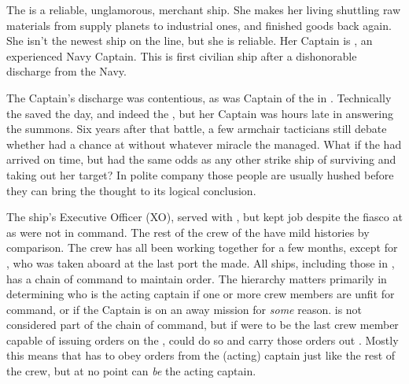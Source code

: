 \documentclass[blue]{TMFHope}
\begin{document}
\name{\bHope{}}

The \pNew{} is a reliable, unglamorous, merchant ship. She makes her living shuttling raw materials from supply planets to industrial ones, and finished goods back again. She isn't the newest ship on the line, but she is reliable. Her Captain is \cCap{}, an experienced Navy Captain. This is \cCap{\their} first civilian ship after a dishonorable discharge from the Navy.  

The Captain's discharge was contentious, as \cCap{} was Captain of the \pOld{} in \pBattle{}. Technically the \pOld{} saved the day, and indeed the \pPlan{}, but her Captain was hours late in answering the summons. Six years after that battle, a few armchair tacticians still debate whether \pPlan{} had a chance at \pHome{} without whatever miracle the \pOld{} managed. What if the \pOld{} had arrived on time, but had the same odds as any other strike ship of surviving and taking out her target? In polite company those people are usually hushed before they can bring the thought to its logical conclusion.

The ship's Executive Officer (XO), \cXO{} served with \cCap{}, but kept \cXO{\their} job despite the fiasco at \pBattle{} as \cXO{\the} were not in command. The rest of the crew of the \pNew{} have mild histories by comparison. The crew has all been working together for a few months, except for \cBoy{}, who was taken aboard at the last port the \pNew{} made. All ships, including those in \pTMF{}, has a chain of command to maintain order. The hierarchy matters primarily in determining who is the acting captain if one or more crew members are unfit for command, or if the Captain is on an away mission for \emph{some} reason. \cBoy{} is not considered part of the chain of command, but if \cBoy{\they} were to be the last crew member capable of issuing orders on the \pNew{}, \cBoy{\they} could do so and carry those orders out \cBoy{\themself}. Mostly this means that \cBoy{} has to obey orders from the (acting) captain just like the rest of the crew, but at no point can \cBoy{} \emph{be} the acting captain.
\end{document}
